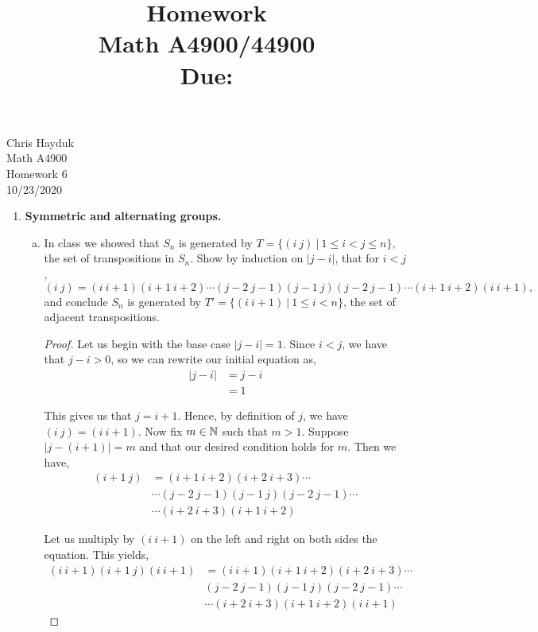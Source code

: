 \documentclass[11pt, reqno]{amsart}
\title[Homework \HW]{Homework \HW \\
Math A4900/44900\\
\small Due: \DUE}
\author{}
\theoremstyle{plain}
\theoremstyle{definition}
\theoremstyle{example}
\def\HW{6}
\def\DUE{10/23/2020}
\begin{document}
\begin{flushright}
Chris Hayduk\\
Math A4900\\
Homework \HW\\
\DUE
\end{flushright}





\begin{enumerate}[1.]
\item  {\bf Symmetric and alternating groups.}
\begin{enumerate}[(a)]
\item In class we showed that $S_n$ is generated by $T = \{(i\ j) ~|~ 1 \leq i < j \leq n \}$, the set of transpositions in $S_n$. Show by induction on $|j-i|$, that for $i<j$, 
$$(i\ j) = (i\ i+1) (i+1 \ i+2) \cdots (j-2\ j-1) (j-1 \ j) (j-2\ j-1) \cdots   (i+1 \ i+2)  (i\ i+1),$$
and conclude $S_n$ is generated by $T' =  \{(i\ i+1) ~|~ 1 \leq i < n \}$, the set of adjacent transpositions.

\begin{proof}
Let us begin with the base case $|j - i| = 1$. Since $i < j$, we have that $j - i > 0$, so we can rewrite our initial equation as,
\begin{align*}
|j - i| &= j - i\\
&= 1
\end{align*}

This gives us that $j = i + 1$. Hence, by definition of $j$, we have $(i\ j) = (i\ i+1)$. Now fix $m \in \mathbb{N}$ such that $m > 1$. Suppose $|j - (i+1)| = m$ and that our desired condition holds for $m$. Then we have,
\begin{align*}
(i+1\ j) &= (i+1\ i+2)(i+2\ i+3) \cdots \\
&\cdots (j-2\ j-1)(j-1\ j)(j-2\ j-1)\cdots \\
&\cdots (i+2\ i+3)(i+1\ i+2)
\end{align*}

Let us multiply by $(i\ i+1)$ on the left and right on both sides the equation. This yields,
\begin{align*}
(i\ i+1)(i+1\ j)(i\ i+1) &= (i\ i+1)(i+1\ i+2)(i+2\ i+3) \cdots \\
&(j-2\ j-1)(j-1\ j)(j-2\ j-1)\cdots \\
&\cdots (i+2\ i+3)(i+1\ i+2)(i\ i+1)
\end{align*}


\end{proof}
\end{enumerate}
\end{enumerate}
\end{document}
